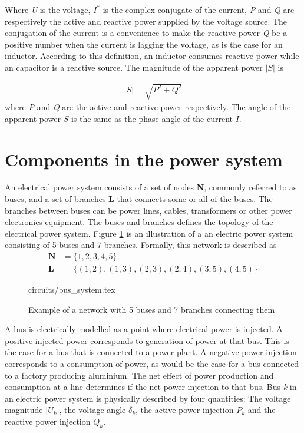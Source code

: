 \documentclass[class=book, crop=false]{standalone}
\begin{document}
Where \textit{U} is the voltage, $I^{*}$ is the complex conjugate of the current, \textit{P} and \textit{Q} are respectively  the active and reactive power supplied by the voltage source. The conjugation of the current is a convenience to make the reactive power \textit{Q} be a positive number when the current is lagging the voltage, as is the case for an inductor. According to this definition, an inductor consumes reactive power while an capacitor is a reactive source. The magnitude of the apparent power $|S|$ is

\begin{equation}
   \begin{aligned}\label{eq:theory:pythagoras_power}
|S| = \sqrt{P^{2} + Q^{2}}
\end{aligned} 
\end{equation}
where \textit{P} and \textit{Q} are the active and reactive power respectively. The angle of the apparent power $S$ is the same as the phase angle of the current $I$. 



\section{Components in the power system}
An electrical power system consists of a set of nodes \textbf{N}, commonly referred to as buses, and a set of branches \textbf{L} that connects some or all of the buses. The branches between buses can be power lines, cables, transformers or other power electronics equipment. The buses and branches defines the topology of the electrical power system. Figure \ref{fig:theory:bus_system} is an illustration of a an electric power system consisting of 5 buses and 7 branches. Formally, this network is described as 
\begin{equation}
   \begin{aligned}\label{eq:theory:network_set}
\textbf{N} &= \{1,2,3,4,5\}\\
\textbf{L} &= \{(1,2),(1,3),(2,3),(2,4),(3,5),(4,5)\}
\end{aligned} 
\end{equation}



\begin{figure}[ht!]
    \center
    {circuits/bus_system.tex}
    \caption[size = 9]
    {Example of a network with 5 buses  and 7 branches connecting them}\label{fig:theory:bus_system}
\end{figure}
A bus is electrically modelled as a point where electrical power is injected. A positive injected power corresponds to generation of power at that bus. This is the case for a bus that is connected to a power plant. A negative power injection corresponds to a consumption of power, as would be the case for a bus connected to a factory producing aluminium. The net effect of power production and consumption at a line determines if the net power injection to that bus. Bus \textit{k} in an electric power system is physically described by four quantities: The voltage magnitude $|U_{k}|$, the voltage angle $\delta_{k}$, the active power injection $P_{k}$ and the reactive power injection $Q_{k}$.
\end{document}
